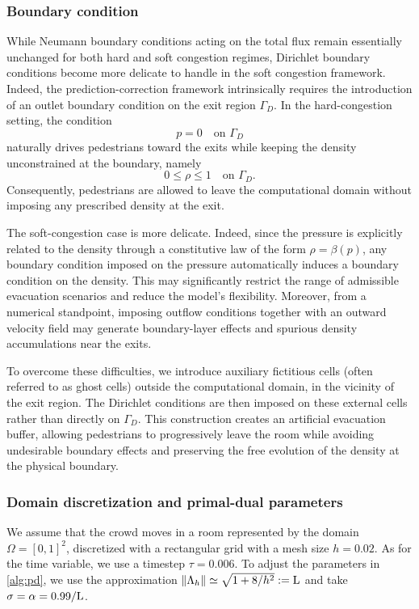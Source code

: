 \documentclass[final,reqno]{amsart}
\theoremstyle{plain}
\theoremstyle{definition}
\theoremstyle{remark}
\numberwithin{remark}{section}	%
\numberwithin{example}{section}	%
\newcommand{\LL}{\textup{{L}}}
\begin{document}
\subsubsection{Boundary condition} While Neumann boundary conditions acting on the total flux remain essentially unchanged for both hard and soft congestion regimes, Dirichlet boundary conditions become more delicate to handle in the soft congestion framework. Indeed, the prediction-correction framework intrinsically requires the introduction of an outlet boundary condition on the exit region $\Gamma_D$. In the hard-congestion setting, the condition
\[
p=0
\quad \text{on } \Gamma_D
\]
naturally drives pedestrians toward the exits while keeping the density unconstrained at the boundary, namely
\[
0\leq \rho \leq 1
\quad \text{on } \Gamma_D.
\]
Consequently, pedestrians are allowed to leave the computational domain without imposing any prescribed density at the exit. 

The soft-congestion case is more delicate. Indeed, since the pressure is explicitly related to the density through a constitutive law of the form $\rho=\beta(p)$, any boundary condition imposed on the pressure automatically induces a boundary condition on the density. This may significantly restrict the range of admissible evacuation scenarios and reduce the model's flexibility. Moreover, from a numerical standpoint, imposing outflow conditions together with an outward velocity field may generate boundary-layer effects and spurious density accumulations near the exits.

To overcome these difficulties, we introduce auxiliary fictitious cells (often referred to as ghost cells) outside the computational domain, in the vicinity of the exit region. The Dirichlet conditions are then imposed on these external cells rather than directly on $\Gamma_D$. This construction creates an artificial evacuation buffer, allowing pedestrians to progressively leave the room while avoiding undesirable boundary effects and preserving the free evolution of the density at the physical boundary.
\subsubsection{Domain discretization and primal-dual parameters}
We assume that the crowd moves in a room represented by the domain $\Omega=[0,1]^2$, discretized with a rectangular grid with a mesh size $h = 0.02$. As for the time variable, we use a timestep $\tau = 0.006$. 
To adjust the parameters in \cref{alg:pd}, we use the approximation $\Vert \Lambda_h\Vert \simeq \sqrt{1 + 8/h^2}:=\LL$ and take $\sigma = \alpha = 0.99/\LL$.
\end{document}
